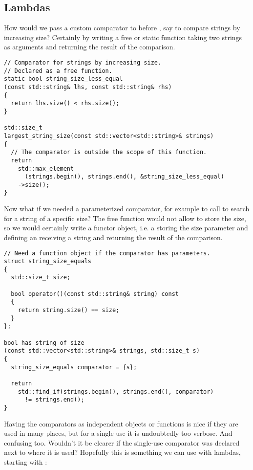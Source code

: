 \subsection{Lambdas}
\label{sec:lambda}

\problemtitle

How would we pass a custom comparator to 
before , say to compare strings by increasing size? Certainly by
writing a free or static function taking two strings as arguments and
returning the result of the comparison.

\begin{lstlisting}
// Comparator for strings by increasing size.
// Declared as a free function.
static bool string_size_less_equal
(const std::string& lhs, const std::string& rhs)
{
  return lhs.size() < rhs.size();
}

std::size_t
largest_string_size(const std::vector<std::string>& strings)
{
  // The comparator is outside the scope of this function.
  return
    std::max_element
      (strings.begin(), strings.end(), &string_size_less_equal)
    ->size();
}
\end{lstlisting}

Now what if we needed a parameterized comparator, for example to call
 to search for a string of a specific size? The
free function would not allow to store the size, so we would
certainly write a functor object, i.e. a  storing the
size parameter and defining an  receiving a string
and returning the result of the comparison.

\begin{lstlisting}
// Need a function object if the comparator has parameters.
struct string_size_equals
{
  std::size_t size;

  bool operator()(const std::string& string) const
  {
    return string.size() == size;
  }
};

bool has_string_of_size
(const std::vector<std::string>& strings, std::size_t s)
{
  string_size_equals comparator = {s};

  return
    std::find_if(strings.begin(), strings.end(), comparator)
      != strings.end();
}
\end{lstlisting}

\solutiontitle

Having the comparators as independent objects or functions is nice if
they are used in many places, but for a single use it is undoubtedly
too verbose. And confusing too. Wouldn't it be clearer if the
single-use comparator was declared next to where it is used?
Hopefully this is something we can use with lambdas, starting with
:

